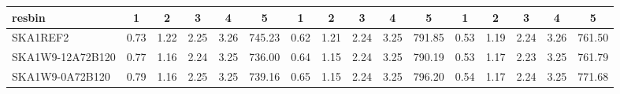 \begin{table}[!htp]
{{\begin{tabular}{|lccccc||ccccc||ccccc|}
 resbin  &1 & 2 & 3 & 4 & 5 & 1 & 2 & 3 & 4 & 5 & 1 & 2 & 3 & 4 & 5 \\ \hline
SKA1REF2 & 0.73 \cellcolor{blue!18.00} & 1.22 \cellcolor{red!60.00} & 2.25 \cellcolor{green!60.00} & 3.26 \cellcolor{orange!60.00} & 745.23 \cellcolor{purple!60.00} & 0.62 \cellcolor{blue!18.00} & 1.21 \cellcolor{red!60.00} & 2.24 \cellcolor{green!60.00} & 3.25 \cellcolor{orange!60.00} & 791.85 \cellcolor{purple!29.58} & 0.53 \cellcolor{blue!18.00} & 1.19 \cellcolor{red!60.00} & 2.24 \cellcolor{green!58.36} & 3.26 \cellcolor{orange!60.00} & 761.50 \cellcolor{purple!18.00}\\ \hline 
SKA1W9-12A72B120 & 0.77 \cellcolor{blue!49.11} & 1.16 \cellcolor{red!18.66} & 2.24 \cellcolor{green!18.00} & 3.25 \cellcolor{orange!18.00} & 736.00 \cellcolor{purple!18.00} & 0.64 \cellcolor{blue!45.86} & 1.15 \cellcolor{red!18.14} & 2.24 \cellcolor{green!18.00} & 3.25 \cellcolor{orange!18.00} & 790.19 \cellcolor{purple!18.00} & 0.53 \cellcolor{blue!37.04} & 1.17 \cellcolor{red!18.00} & 2.23 \cellcolor{green!18.00} & 3.25 \cellcolor{orange!18.00} & 761.79 \cellcolor{purple!19.21}\\ \hline 
SKA1W9-0A72B120 & 0.79 \cellcolor{blue!60.00} & 1.16 \cellcolor{red!18.00} & 2.25 \cellcolor{green!51.52} & 3.25 \cellcolor{orange!18.51} & 739.16 \cellcolor{purple!32.37} & 0.65 \cellcolor{blue!60.00} & 1.15 \cellcolor{red!18.00} & 2.24 \cellcolor{green!54.30} & 3.25 \cellcolor{orange!37.32} & 796.20 \cellcolor{purple!60.00} & 0.54 \cellcolor{blue!60.00} & 1.17 \cellcolor{red!31.63} & 2.24 \cellcolor{green!60.00} & 3.25 \cellcolor{orange!49.09} & 771.68 \cellcolor{purple!60.00}\\ \hline 
\end{tabular}}
\hspace{1cm} 
}
\end{table}
